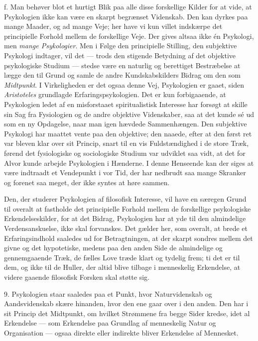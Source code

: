 \documentclass[12pt,a4paper,openany]{book}
\newcommand{\opage}[1]{\marginnote{\footnotesize\textit{[#1]}}}
\begin{document}
f. Man behøver blot et hurtigt Blik paa alle disse forskellige Kilder
for at vide, at Psykologien ikke kan være en skarpt begrænset Videnskab.
Den kan dyrkes paa mange Maader, og ad mange Veje; her have vi kun
villet indskærpe det principielle Forhold mellem de forskellige Veje.
Der gives altsaa ikke én Psykologi, men \emph{mange Psykologier}. Men i
Følge den principielle Stilling, den subjektive Psykologi indtager, vil
det --- trods den stigende Betydning af det objektive psykologiske
Studium --- stedse være en naturlig og berettiget Bestræbelse at lægge
den til Grund og samle de andre Kundskabskilders Bidrag om den som
\emph{Midtpunkt}. I Virkeligheden er det ogsaa denne Vej, Psykologien er
gaaet, siden \emph{Aristoteles} grundlagde Erfaringspsykologien. Det er
kun forbigaaende, at Psykologien ledet af en misforstaaet
spiritualistisk Interesse har forsøgt at skille sin Sag fra Fysiologien
og de andre objektive Videnskaber, saa at det kunde sé ud som en ny
Opdagelse, naar man igen hævdede Sammenhængen. Den subjektive Psykologi
har maattet vente paa den objektive; den
\opage{33}naaede, efter at den først ret var bleven klar over sit
Princip, snart til en vis Fuldstændighed i de store Træk, førend det
fysiologiske og sociologiske Studium var udviklet saa vidt, at det for
Alvor kunde arbejde Psykologien i Hænderne. I denne Henseende kan der
siges at være indtraadt et Vendepunkt i vor Tid, der har nedbrudt saa
mange Skranker og forenet saa meget, der ikke syntes at høre sammen.

Den, der studerer Psykologien af filosofisk Interesse, vil have en
særegen Grund til overalt at fastholde det principielle Forhold mellem
de forskellige psykologiske Erkendelseskilder, for at det Bidrag,
Psykologien har at yde til den almindelige Verdensanskuelse, ikke skal
forvanskes. Det gælder her, som overalt, at brede et Erfaringsindhold
saaledes ud for Betragtningen, at der skarpt sondres mellem det givne og
det hypotetiske, medens paa den anden Side de almindelige og
gennemgaaende Træk, de fælles Love træde klart og tydelig frem; ti det
er til dem, og ikke til de Huller, der altid blive tilbage i menneskelig
Erkendelse, at videre gaaende filosofisk Forsken skal støtte sig.

9. Psykologien staar saaledes paa et Punkt, hvor Naturvidenskab og
Aandsvidenskab skære hinanden, hvor den ene gaar over i den anden. Den
har i sit Princip det Midtpunkt, om hvilket Strømmene fra begge Sider
kredse, idet al Erkendelse --- som Erkendelse paa Grundlag af
menneskelig Natur og Organisation --- ogsaa direkte eller indirekte
bliver Erkendelse af Mennesket.
\end{document}
